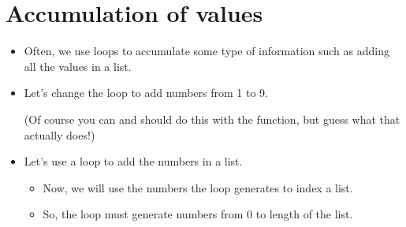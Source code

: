 \documentclass[letterpaper,10pt,english]{sphinxmanual}
\begin{document}
\section{Accumulation of values}
\label{\detokenize{lecture_notes/lec09_loops1_while:accumulation-of-values}}\begin{itemize}
\item {} 
Often, we use loops to accumulate some type of information such as
adding all the values in a list.

\item {} 
Let’s change the loop to add numbers from 1 to 9.

%
\begin{sphinxVerbatim}[commandchars=\\\{\}]
  
 
      
      
\end{sphinxVerbatim}

(Of course you can and should do this with the 
function, but guess what that actually does!)

\item {} 
Let’s use a loop to add the numbers in a list.
\begin{itemize}
\item {} 
Now, we will use the numbers the loop generates to index a list.

\item {} 
So, the loop must generate numbers from 0 to length of the list.

\end{itemize}

%
\begin{sphinxVerbatim}[commandchars=\\\{\}]
  \PYG{p}{[}      \PYGZbs{}
                    \PYGZbs{}
                    \PYGZbs{}
                 \PYG{p}{]}


\end{sphinxVerbatim}
\end{itemize}
\end{document}
